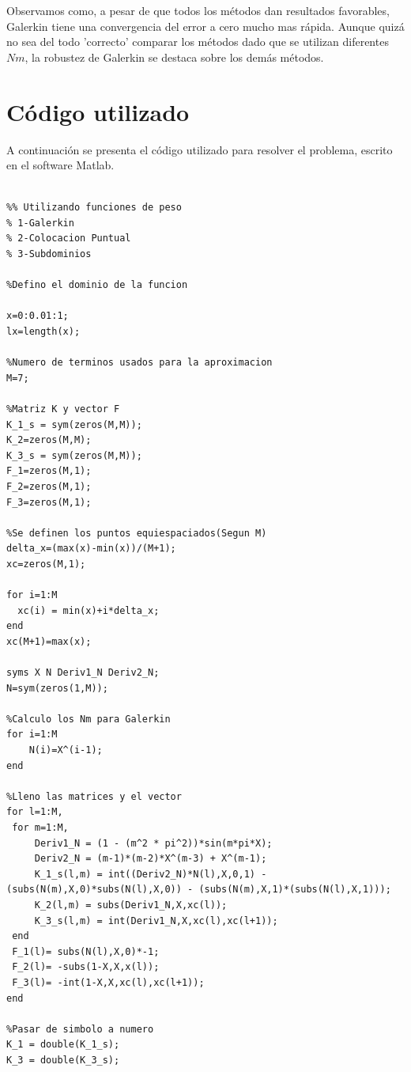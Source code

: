 \documentclass[11pt]{article}
\begin{document}
\bigskip Observamos como, a pesar de que todos los m\'etodos dan resultados favorables, Galerkin tiene una convergencia del error a cero mucho mas r\'apida. Aunque quiz\'a no sea del todo 'correcto' comparar los m\'etodos dado que se utilizan diferentes $Nm$, la robustez de Galerkin se destaca sobre los dem\'as m\'etodos. 

\section{C\'odigo utilizado}

A continuaci\'on se presenta el c\'odigo utilizado para resolver el problema, escrito en el software Matlab.

\bigskip
\lstset{language=Matlab, breaklines=true, basicstyle=\footnotesize}
\begin{lstlisting}[frame=single]
%% Aproximacion a PDE por una funcion continua de prueba a traves del metodo de residuos ponderados

%% Utilizando funciones de peso
% 1-Galerkin
% 2-Colocacion Puntual
% 3-Subdominios

%Defino el dominio de la funcion

x=0:0.01:1;
lx=length(x);

%Numero de terminos usados para la aproximacion
M=7;

%Matriz K y vector F
K_1_s = sym(zeros(M,M));
K_2=zeros(M,M);
K_3_s = sym(zeros(M,M));
F_1=zeros(M,1);
F_2=zeros(M,1);
F_3=zeros(M,1);

%Se definen los puntos equiespaciados(Segun M)
delta_x=(max(x)-min(x))/(M+1); 
xc=zeros(M,1);

for i=1:M
  xc(i) = min(x)+i*delta_x;
end
xc(M+1)=max(x);

syms X N Deriv1_N Deriv2_N;
N=sym(zeros(1,M));

%Calculo los Nm para Galerkin
for i=1:M
    N(i)=X^(i-1);
end

%Lleno las matrices y el vector
for l=1:M,
 for m=1:M,
	 Deriv1_N = (1 - (m^2 * pi^2))*sin(m*pi*X); 
     Deriv2_N = (m-1)*(m-2)*X^(m-3) + X^(m-1);
     K_1_s(l,m) = int((Deriv2_N)*N(l),X,0,1) - (subs(N(m),X,0)*subs(N(l),X,0)) - (subs(N(m),X,1)*(subs(N(l),X,1))); 
	 K_2(l,m) = subs(Deriv1_N,X,xc(l));
     K_3_s(l,m) = int(Deriv1_N,X,xc(l),xc(l+1));
 end
 F_1(l)= subs(N(l),X,0)*-1;
 F_2(l)= -subs(1-X,X,x(l));
 F_3(l)= -int(1-X,X,xc(l),xc(l+1));
end

%Pasar de simbolo a numero 
K_1 = double(K_1_s);
K_3 = double(K_3_s);


\end{lstlisting}
\end{document}
